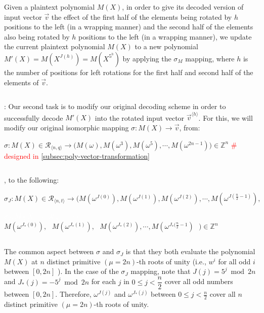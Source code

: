 Given a plaintext polynomial $M(X)$, in order to give its decoded version of input vector $\vec{v}$ the effect of the first half of the elements being rotated by $h$ positions to the left (in a wrapping manner) and the second half of the elements also being rotated by $h$ positions to the left (in a wrapping manner), we update the current plaintext polynomial $M(X)$ to a new polynomial $M'(X) = M(X^{J(h)}) = M(X^{5^h})$ by applying the $\sigma_M$ mapping, where $h$ is the number of positions for left rotations for the first half and second half of the elements of $\vec{v}$. 


$ $

: Our second task is to modify our original decoding scheme in order to successfully decode $M'(X)$ into the rotated input vector $\vec{v}^{\langle h \rangle}$. For this, we will modify our original isomorphic mapping $\sigma : M(X) \longrightarrow \vec{v}$, from:

$\sigma: M(X) \in \mathcal{R}_{\langle n, q \rangle} \longrightarrow  \bm{(}M(\omega), M(\omega^3),M(\omega^5), \cdots, M(\omega^{2n-1})\bm{)} \in \mathbb{Z}^n$ \textcolor{red}{ \text{ } \# designed in \autoref{subsec:poly-vector-transformation}}

$ $

, to the following: 

$\sigma_J: M(X) \in \mathcal{R}_{\langle n, t \rangle} \longrightarrow  \bm{(}M(\omega^{J(0)}),M(\omega^{J(1)}),M(\omega^{J(2)}), \cdots, M(\omega^{J(\frac{n}{2} - 1)}), $

\textcolor{white}{$\sigma_J: M(X) \in \mathcal{R}_{\langle n, q \rangle} \longrightarrow  \bm{(}$} $M(\omega^{J_*(0)}), \text{ } M(\omega^{J_*(1)}), \text{ } M(\omega^{J_*(2)}), \cdots, M(\omega^{J_*(\frac{n}{2} - 1}) \text{ } \bm{)} \in \mathbb{Z}^{n}$



$ $

The common aspect between $\sigma$ and $\sigma_J$ is that they both evaluate the polynomial $M(X)$ at $n$ distinct primitive $(\mu=2n)$-th roots of unity (i.e., $w^i$ for all odd $i$ between $[0,2n]$ ). In the case of the $\sigma_J$ mapping, note that $J(j) = 5^j \bmod 2n$ \text{ } and \text{ } $J_*(j) = -5^j \bmod 2n$ \text{ } for each $j$ in $0 \leq j < \dfrac{n}{2} $ \text{ }  cover all odd numbers between $[0, 2n]$. Therefore, $\omega^{J(j)}$ and $\omega^{J_*(j)}$ between $0 \leq j < \frac{n}{2}$ cover all $n$ distinct primitive $(\mu=2n)$-th roots of unity.

